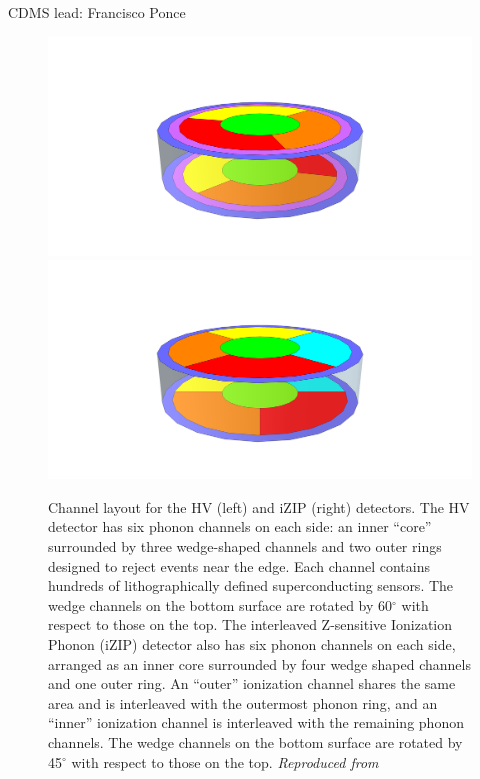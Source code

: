CDMS lead: Francisco Ponce
\begin{figure}
\begin{center}
\includegraphics[width=.45\textwidth, trim={600 200 600 350},clip]{figures/f01a_HV_Detector_Schematic.png}
\includegraphics[width=.45\textwidth, trim={600 200 600 350},clip]{figures/f01b_iZIP_Detector_Schematic.png}
\end{center}
\caption{Channel layout for the HV (left) and iZIP (right) detectors. The HV detector has six phonon channels on each side: an inner ``core'' surrounded by three wedge-shaped channels and two outer rings designed to reject events near the edge. Each channel contains hundreds of lithographically defined superconducting sensors. The wedge channels on the bottom surface are rotated by 60$^\circ$ with respect to those on the top.
The interleaved Z-sensitive Ionization Phonon (iZIP) detector also has six phonon channels on each side, arranged as an inner core surrounded by four wedge shaped channels and one outer ring. An ``outer'' ionization channel shares the same area and is interleaved with the outermost phonon ring, and an ``inner'' ionization channel is interleaved with the remaining phonon channels. The wedge channels on the bottom surface are rotated by 45$^\circ$ with respect to those on the top. \it{Reproduced from ~\cite{SCDMS2017}}}
\label{fig:SCDMS_Detectors}
\end{figure}

